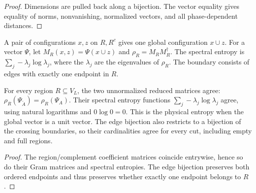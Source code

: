 \begin{proof}\leanok
    Dimensions are pulled back along a bijection. The vector equality
    gives equality of norms, nonvanishing, normalized vectors, and all
    phase-dependent distances.
\end{proof}

\begin{definition}%
    \label{def:peps_square_regional_coefficients}
    \leanok
    A pair of configurations $x,z$ on $R,R^c$ gives one global configuration
    $x\cup z$. For a vector $\Psi$, let $M_R(x,z)=\Psi(x\cup z)$ and
    $\rho_R=M_RM_R^\dagger$. The spectral entropy is
    $\sum_j-\lambda_j\log\lambda_j$, where the $\lambda_j$ are the eigenvalues
    of $\rho_R$. The boundary consists of edges with exactly one endpoint in $R$.
\end{definition}

\begin{theorem}%
    \label{thm:peps_square_regions_exact}
    \leanok
    For every region $R\subseteq V_L$, the two unnormalized reduced
    matrices agree: $\rho_R(\Psi_{\widetilde A})=\rho_R(\Psi_A)$.
    Their spectral entropy functions $\sum_j-\lambda_j\log\lambda_j$
    agree, using natural logarithms and $0\log0=0$. This is the physical
    entropy when the global vector is a unit vector. The edge bijection
    also restricts to a bijection of the crossing boundaries, so their
    cardinalities agree for every cut, including empty and full regions.
\end{theorem}

\begin{proof}\leanok
    The region/complement coefficient matrices coincide entrywise, hence
    so do their Gram matrices and spectral entropies. The edge bijection
    preserves both ordered endpoints and thus preserves whether exactly
    one endpoint belongs to $R$.
\end{proof}
